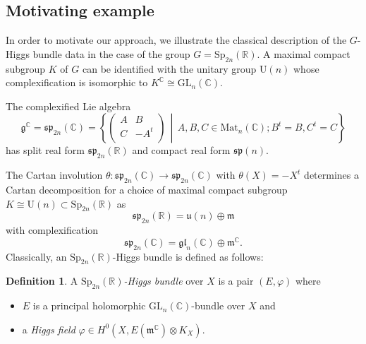 \documentclass[oneside,11pt]{amsart}
\theoremstyle{definition}
\newtheorem{defn}[thm]{Definition}
\theoremstyle{remark}
\newcommand{\midwd}{\,\middle\vert\,}
\numberwithin{thm}{section}
\numberwithin{equation}{section}
\begin{document}
\subsection{Motivating example}
In order to motivate our approach, we illustrate the classical description of the $G$-Higgs bundle data in the case of the group $G=\mathrm{Sp}_{2n}(\mathbb{R})$. A maximal compact subgroup $K$ of $G$ can be identified with the unitary group $\mathrm{U}(n)$ whose complexification is isomorphic to $K^\mathbb C
\cong \mathrm{GL}_n(\mathbb C)$.


The complexified Lie algebra
\[{{\mathfrak{g}}^{\mathbb{C}}}=\mathfrak{sp}_{2n}\left(\mathbb{C} \right)=\left\{ \left( \begin{matrix}
   A & B  \\
   C & -{{A}^{t}}  \\
\end{matrix} \right)\midwd A,B,C\in {{\mathsf{\mathrm{Mat}}}_{n}}\left( \mathbb{C} \right);{{B}^{t}}=B,{{C}^{t}}=C \right\}\] has split real form $\mathfrak{sp}_{2n}\left(\mathbb{R} \right)$ and compact real form $\mathfrak{sp}(n)$.

The Cartan involution $\theta :\mathfrak{sp}_{2n}\left(\mathbb{C} \right)\to \mathfrak{sp}_{2n}\left(\mathbb{C} \right)$ with $\theta \left( X \right)=-{{X}^{t}}$ determines a Cartan decomposition for a choice of maximal compact subgroup  $K\cong  \mathrm{U}(n)\subset \mathrm{Sp}_{2n}( \mathbb{R})$ as
	\[\mathfrak{sp}_{2n}\left(\mathbb{R} \right)=\mathfrak{u}\left(n \right)\oplus \mathfrak{m}\]
	with complexification 
    \begin{equation*}\label{Cartan_complex_sp2n}\mathfrak{sp}_{2n}\left( \mathbb{C} \right)=\mathfrak{gl}_n\left(\mathbb{C} \right)\oplus {{\mathfrak{m}}^{\mathbb{C}}}.
    \end{equation*}
Classically, an $\mathrm{Sp}_{2n}(\mathbb R)$-Higgs bundle is defined as follows:

\begin{defn}
A \emph{$\mathrm{Sp}_{2n}(\mathbb R)$-Higgs bundle} over $X$ is a pair $\left( E,\varphi  \right)$ where
\begin{itemize}
  \item $E$ is a principal holomorphic $\mathrm{GL}_n(\mathbb C)$-bundle over $X$ and
  \item a \emph{Higgs field} $\varphi \in H^0(X,E\left( {{\mathfrak{m}}^{\mathbb{C}}} \right)\otimes K_X)$.
\end{itemize}
\end{defn}
\end{document}
